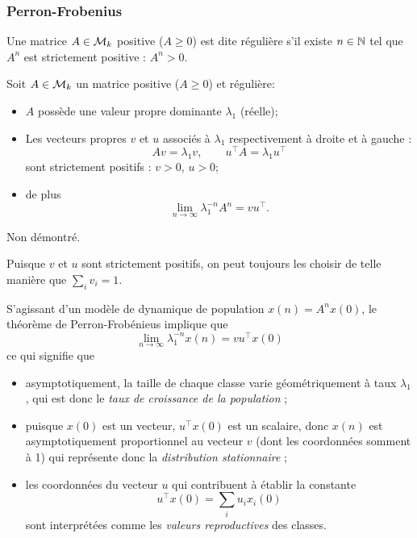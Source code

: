 \subsubsection{Perron-Frobenius}

\begin{definition}
  Une matrice $A \in \mathcal{M}_k$ positive ($A \geq 0$) est dite régulière s'il existe $n \in \mathbb{N}$ tel que $A^n$ est strictement positive : $A^n > 0$.
\end{definition}

\begin{theorem} \label{thm:perronFrobenius}
  Soit $A \in \mathcal{M}_k$ un matrice positive ($A \geq 0$) et régulière:
  \begin{itemize}
    \item $A$ possède une valeur propre dominante $\lambda_1$ (réelle);
    \item Les vecteurs propres $v$ et $u$ associés à $\lambda_1$ respectivement à droite et à gauche : 
    $$
    A v = \lambda_1 v, \qquad u^\top A = \lambda_1 u^\top
    $$
    sont strictement positifs : $v > 0$, $u > 0$;
    \item de plus
    $$
    \lim_{n \to \infty} \lambda_1^{-n} A^n = v u^\top.
    $$
  \end{itemize}
\end{theorem}

\proof
Non démontré. 
\eproof

\remark
Puisque $v$ et $u$ sont strictement positifs, on peut toujours les choisir de telle manière que $\sum_i v_i = 1$.

\remark
S'agissant d'un modèle de dynamique de population $x(n) = A^n x(0)$, le théorème de Perron-Frobénieus implique que 
$$
\lim_{n \to \infty} \lambda_1^{-n} x(n) = v u^\top x(0)
$$
ce qui signifie que
\begin{itemize}
 \item asymptotiquement, la taille de chaque classe varie géométriquement à taux $\lambda_1$, qui est donc le {\em taux de croissance de la population} ; 
 \item puisque $x(0)$ est un vecteur, $u^\top x(0)$ est un scalaire, donc $x(n)$ est asymptotiquement proportionnel au vecteur $v$ (dont les coordonnées somment à 1) qui représente donc la {\em distribution stationnaire} ;
 \item les coordonnées du vecteur $u$ qui contribuent à établir la constante 
 $$
 u^\top x(0) = \sum_i u_i x_i(0)
 $$
 sont interprétées comme les {\em valeurs reproductives} des classes.
\end{itemize}

